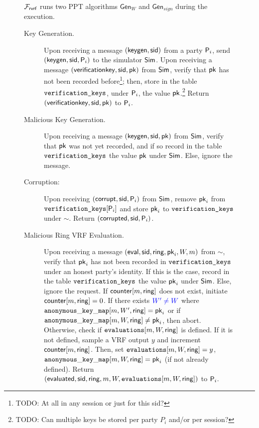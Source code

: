 


\newcommand{\Gen}{\ensuremath{\mathsf{Gen}}}

\newcommand{\counter}{\ensuremath{\mathsf{counter}}\xspace}
\newcommand{\anonymouskeymap}{\ensuremath{\mathtt{anonymous\_key\_map}}\xspace}



\begin{figure}\scriptsize
\begin{tcolorbox}
{ $ \mathcal{F}_{\textsf{rvrf}} $ runs two PPT algorithms $ \Gen_W$ and $\Gen_{sign} $ during the execution.

\begin{description}
	\item[Key Generation.] Upon receiving a message $(\mathsf{keygen}, \textsf{sid})$ from a party $\mathsf{P}_i$, send $(\mathsf{keygen}, \textsf{sid}, \mathsf{P}_i)$ to the simulator $\mathsf{Sim}$.
	Upon receiving a message $(\mathsf{verificationkey}, \textsf{sid}, \mathsf{pk})$ from $\mathsf{Sim}$, verify that $\mathsf{pk}$ has not been recorded before\footnote{{ \color{blue} TODO: At all in any session or just for this sid?}}; then, store in the table $\texttt{verification\_keys}$, under $\mathsf{P}_i$, the value $\mathsf{pk}$.\footnote{{ \color{blue} TODO: Can multiple keys be stored per party $P_i$ and/or per session?}}
	Return $(\mathsf{verificationkey}, \textsf{sid}, \mathsf{pk})$ to $ \mathsf{P}_i$.

	\item[Malicious Key Generation.] Upon receiving a message $(\mathsf{keygen}, \textsf{sid}, \mathsf{pk})$ from $\mathsf{Sim}$, verify that $\mathsf{pk}$ was not yet recorded, and if so record in the table $\texttt{verification\_keys}$ the value $\mathsf{pk}$ under $\mathsf{Sim}$. Else, ignore the message.
	
	\item [Corruption:]  Upon receiving $ (\mathsf{corrupt}, \textsf{sid}, \mathsf{P}_i) $ from $ \mathsf{Sim} $, remove $ \mathsf{pk}_i $ from $ \texttt{verification\_keys}[\mathsf{P}_i] $ and store $ \mathsf{pk}_i $ to $ \texttt{verification\_keys} $ under $ \sim $. Return $ (\mathsf{corrupted}, \textsf{sid},\mathsf{P}_i) $.
	\item[Malicious Ring VRF Evaluation.] Upon receiving a message $(\mathsf{eval}, \textsf{sid}, \mathsf{ring}, \mathsf{pk}_i, W, m)$ from $\sim$, verify that $ \mathsf{pk}_i $ has not been recorded in $\texttt{verification\_keys}$ under an honest party's identity.
	If this is the case, record in the table $\texttt{verification\_keys}$ the value $\mathsf{pk}_i$ under $\mathsf{Sim}$. Else, ignore the request.  If $ \counter[m,\ringset] $ does not exist, initiate $ \counter[m,\ringset] = 0 $. If there exists ${\color{blue} W' \neq W }$ where 
	{\color{blue} $\anonymouskeymap[m,W',\ringset] = \pk_i$ or if $\anonymouskeymap[m,W,\ringset] \neq \pk_i$}, then abort. 
	Otherwise, check if $ \texttt{evaluations}[m,W,\mathsf{ring}] $ is defined. If it is not defined, sample a VRF output $y$ and increment $ \counter[m,\ringset] $. Then, set $ \texttt{evaluations}[m, W, \mathsf{ring}] = y$, $ \anonymouskeymap[m,W,\ringset] = \pk_i $ (if not already defined).
	Return $(\mathsf{evaluated}, \textsf{sid}, \mathsf{ring}, m, W, \texttt{evaluations}[m, W, \mathsf{ring}])$ to $ \mathsf{P}_i $.
	

\end{description}}
\end{tcolorbox}
\end{figure}
